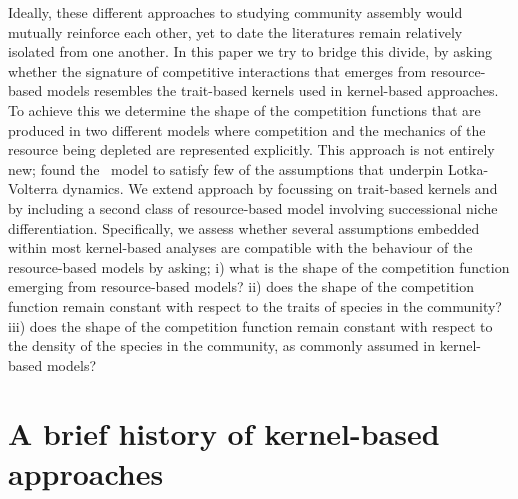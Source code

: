 \documentclass[a4paper,11pt]{article}
\begin{document}
Ideally, these different approaches to studying community assembly
would mutually reinforce each other, yet to date the literatures
remain relatively isolated from one another.
%
In this paper we try to bridge this divide, by asking whether the
signature of competitive interactions that emerges from resource-based
models resembles the trait-based kernels used in kernel-based
approaches.
%
To achieve this we determine the shape of the competition functions
that are produced in two different models where competition and the
mechanics of the resource being depleted are represented explicitly.
%
This approach is not entirely new; \citet{Abrams-2008} found the \Rstar\
model
to satisfy few of the assumptions that underpin Lotka-Volterra
dynamics.
%
We extend \citeauthor{Abrams-2008} approach by focussing on trait-based kernels and
by
including a second class of resource-based model involving
successional niche differentiation.
%
Specifically, we assess whether several assumptions embedded within
most kernel-based analyses are compatible with the behaviour of the
resource-based models by asking;
%
i) what is the shape of the competition function emerging from resource-based
models?
%
ii) does the shape of the competition function remain constant with
respect to the traits of species in the community?
%
iii) does the shape of the competition function remain constant with
respect to the density of the species in the community, as commonly
assumed in kernel-based models?

\section{A brief history of kernel-based approaches}


\end{document}
